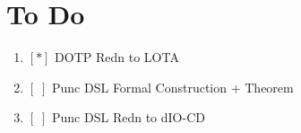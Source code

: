 \section{To Do}\label{sec:todo}

\begin{enumerate}
\item $[*]$ DOTP Redn to LOTA
\item $[\;]$ Punc DSL Formal Construction + Theorem
\item $[\;]$ Punc DSL Redn to dIO-CD
\end{enumerate}
